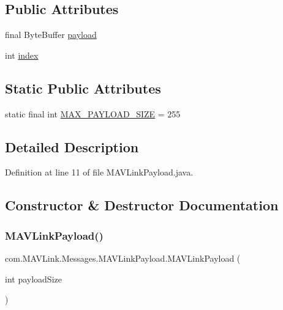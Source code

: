 \subsection*{Public Attributes}
\begin{DoxyCompactItemize}
\item 
final Byte\+Buffer \mbox{\hyperlink{classcom_1_1MAVLink_1_1Messages_1_1MAVLinkPayload_ad41fcde73cb0645d22f6b7af0539ffae}{payload}}
\item 
int \mbox{\hyperlink{classcom_1_1MAVLink_1_1Messages_1_1MAVLinkPayload_a6ba9638303695d2a61ddfb3bfb5fce64}{index}}
\end{DoxyCompactItemize}
\subsection*{Static Public Attributes}
\begin{DoxyCompactItemize}
\item 
static final int \mbox{\hyperlink{classcom_1_1MAVLink_1_1Messages_1_1MAVLinkPayload_a878b05baa8a57e5cfc5177f84b668243}{M\+A\+X\+\_\+\+P\+A\+Y\+L\+O\+A\+D\+\_\+\+S\+I\+ZE}} = 255
\end{DoxyCompactItemize}


\subsection{Detailed Description}


Definition at line 11 of file M\+A\+V\+Link\+Payload.\+java.



\subsection{Constructor \& Destructor Documentation}
\mbox{\label{classcom_1_1MAVLink_1_1Messages_1_1MAVLinkPayload_a52241a9e8926e1509ce7e0ca8c739650}} 
\subsubsection{\texorpdfstring{MAVLinkPayload()}{MAVLinkPayload()}}
{\footnotesize\ttfamily com.\+M\+A\+V\+Link.\+Messages.\+M\+A\+V\+Link\+Payload.\+M\+A\+V\+Link\+Payload (\begin{DoxyParamCaption}\item[{int}]{payload\+Size }\end{DoxyParamCaption})\hspace{0.3cm}{\ttfamily [inline]}}



